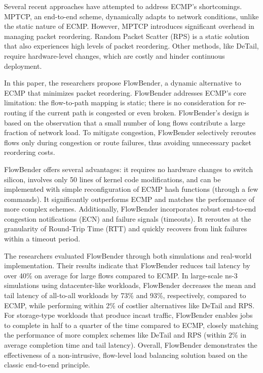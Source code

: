 \documentclass[11pt, sigplan]{acmart}
\begin{document}
Several recent approaches have attempted to address ECMP's shortcomings. MPTCP, an end-to-end scheme, dynamically adapts to network conditions, unlike the static nature of ECMP. However, MPTCP introduces significant overhead in managing packet reordering. Random Packet Scatter (RPS) is a static solution that also experiences high levels of packet reordering. Other methods, like DeTail, require hardware-level changes, which are costly and hinder continuous deployment.

In this paper, the researchers propose FlowBender, a dynamic alternative to ECMP that minimizes packet reordering. FlowBender addresses ECMP's core limitation: the flow-to-path mapping is static; there is no consideration for re-routing if the current path is congested or even broken. FlowBender’s design is based on the observation that a small number of long flows contribute a large fraction of network load. To mitigate congestion, FlowBender selectively reroutes flows only during congestion or route failures, thus avoiding unnecessary packet reordering costs.

FlowBender offers several advantages: it requires no hardware changes to switch silicon, involves only 50 lines of kernel code modifications, and can be implemented with simple reconfiguration of ECMP hash functions (through a few commands). It significantly outperforms ECMP and matches the performance of more complex schemes. Additionally, FlowBender incorporates robust end-to-end congestion notifications (ECN) and failure signals (timeouts). It reroutes at the granularity of Round-Trip Time (RTT) and quickly recovers from link failures within a timeout period.

The researchers evaluated FlowBender through both simulations and real-world implementation. Their results indicate that FlowBender reduces tail latency by over 40\% on average for large flows compared to ECMP. In large-scale ns-3 simulations using datacenter-like workloads, FlowBender decreases the mean and tail latency of all-to-all workloads by 73\% and 93\%, respectively, compared to ECMP, while performing within 2\% of costlier alternatives like DeTail and RPS. For storage-type workloads that produce incast traffic, FlowBender enables jobs to complete in half to a quarter of the time compared to ECMP, closely matching the performance of more complex schemes like DeTail and RPS (within 2\% in average completion time and tail latency). Overall, FlowBender demonstrates the effectiveness of a non-intrusive, flow-level load balancing solution based on the classic end-to-end principle.
\end{document}
